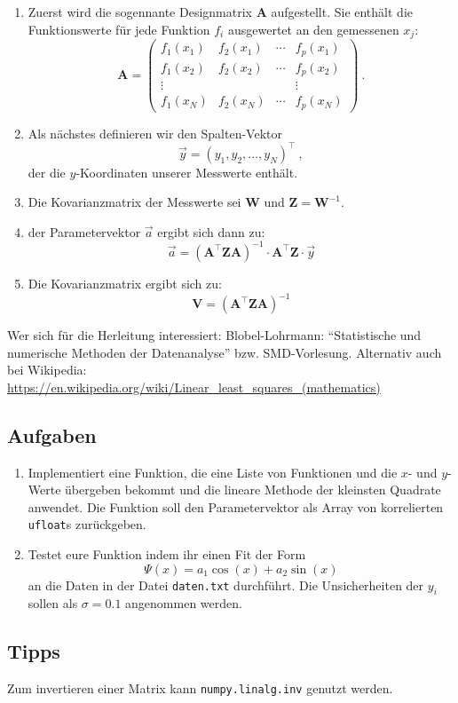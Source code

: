 \documentclass{scrartcl}
\begin{document}
\begin{enumerate}
  \item Zuerst wird die sogennante Designmatrix $\symbf{A}$ aufgestellt.
    Sie enthält die Funktionswerte für jede Funktion $f_i$ ausgewertet an den gemessenen $x_j$:
    \begin{equation}
      \symbf{A} =
      \begin{pmatrix}
        f_1(x_1) & f_2(x_1) & \cdots & f_p(x_1) \\
        f_1(x_2) & f_2(x_2) & \cdots & f_p(x_2) \\
        \vdots   &          &        &  \vdots  \\
        f_1(x_N) & f_2(x_N) & \cdots & f_p(x_N)
      \end{pmatrix} \ .
    \end{equation}
  \item Als nächstes definieren wir den Spalten-Vektor
    \begin{equation}
      \vec{y} = (y_1, y_2, …, y_N)^{\top} \ ,
    \end{equation}
    der die $y$-Koordinaten unserer Messwerte enthält.
  \item Die Kovarianzmatrix der Messwerte sei $\symbf{W}$ und $\symbf{Z} = \symbf{W}^{-1}$.
  \item der Parametervektor $\vec{a}$ ergibt sich dann zu:
    \begin{equation}
      \vec{a} = \left(\symbf{A}^\top \symbf{Z} \symbf{A}\right)^{-1} \cdot \symbf{A}^\top \symbf{Z} \cdot \vec{y}
    \end{equation}
  \item Die Kovarianzmatrix ergibt sich zu:
    \begin{equation}
      \symbf{V} = \left(\symbf{A}^\top \symbf{Z} \symbf{A}\right)^{-1}
    \end{equation}
\end{enumerate}
Wer sich für die Herleitung interessiert: Blobel-Lohrmann: \enquote{Statistische und numerische Methoden der Datenanalyse} bzw. SMD-Vorlesung.
Alternativ auch bei Wikipedia: \url{https://en.wikipedia.org/wiki/Linear_least_squares_(mathematics)}

\subsection*{Aufgaben}

\begin{enumerate}
  \item Implementiert eine Funktion, die eine Liste von Funktionen und die $x$- und $y$-Werte übergeben bekommt und die lineare Methode der kleinsten Quadrate anwendet.
    Die Funktion soll den Parametervektor als Array von korrelierten \texttt{ufloat}s zurückgeben.
  \item Testet eure Funktion indem ihr einen Fit der Form
    \begin{equation}
      \Psi(x) = a_1 \cos(x) + a_2 \sin(x)
    \end{equation}
    an die Daten in der Datei \texttt{daten.txt} durchführt.
    Die Unsicherheiten der $y_i$ sollen als $\sigma = \num{0.1}$ angenommen werden.
\end{enumerate}

\subsection*{Tipps}

Zum invertieren einer Matrix kann \texttt{numpy.linalg.inv} genutzt werden.
\end{document}
